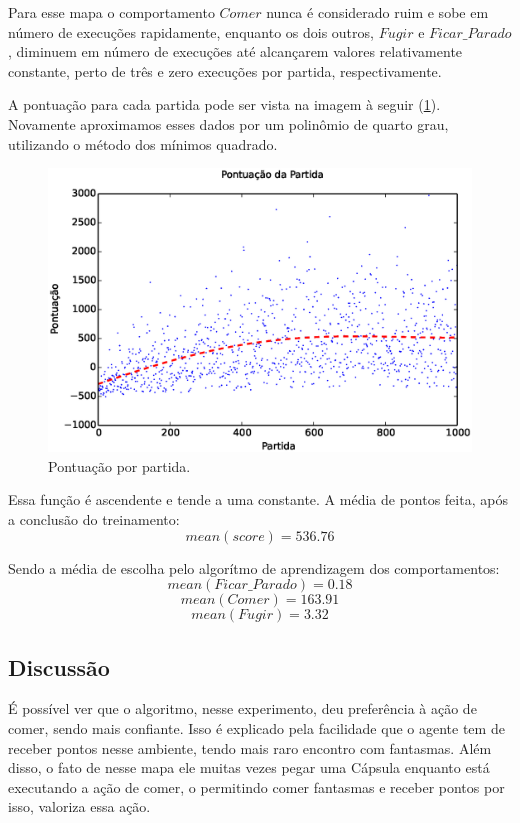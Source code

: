 Para esse mapa o comportamento $ Comer $ nunca é considerado ruim e sobe em número de execuções rapidamente, enquanto os dois outros, $ Fugir $ e $ Ficar\_Parado $, diminuem em número de execuções até alcançarem valores relativamente constante, perto de três e zero execuções por partida, respectivamente.

A pontuação para cada partida pode ser vista na imagem à seguir (\ref{img:3ComportamentosMapaOriginal:PontuacaoPorPartida}). Novamente aproximamos esses dados por um polinômio de quarto grau, utilizando o método dos mínimos quadrado.

\begin{figure}[H]
    \centering
    \includegraphics[width=\linewidth]{images/3_behaviors_original_map/match_scores____pol}
    \caption{Pontuação por partida.}
    \label{img:3ComportamentosMapaOriginal:PontuacaoPorPartida}
\end{figure}

Essa função é ascendente e tende a uma constante. A média de pontos feita, após a conclusão do treinamento:
$$ mean \left( score \right) = 536.76 $$

Sendo a média de escolha pelo algorítmo de aprendizagem dos comportamentos:
$$ mean \left( Ficar\_Parado \right) = 0.18 $$
$$ mean \left( Comer \right) = 163.91 $$
$$ mean \left( Fugir \right) = 3.32 $$


\subsection{Discussão}

É possível ver que o algoritmo, nesse experimento, deu preferência à ação de comer, sendo mais confiante. Isso é explicado pela facilidade que o agente tem de receber pontos nesse ambiente, tendo mais raro encontro com fantasmas. Além disso, o fato de nesse mapa ele muitas vezes pegar uma Cápsula enquanto está executando a ação de comer, o permitindo comer fantasmas e receber pontos por isso, valoriza essa ação.


